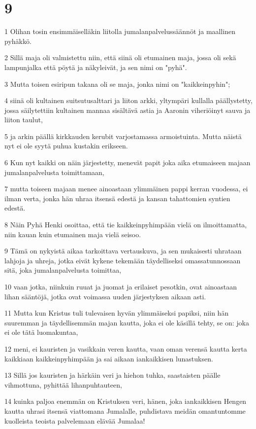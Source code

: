 \chapter{9}

\par 1 Olihan tosin ensimmäiselläkin liitolla jumalanpalvelussäännöt ja maallinen pyhäkkö.
\par 2 Sillä maja oli valmistettu niin, että siinä oli etumainen maja, jossa oli sekä lampunjalka että pöytä ja näkyleivät, ja sen nimi on "pyhä".
\par 3 Mutta toisen esiripun takana oli se maja, jonka nimi on "kaikkeinpyhin";
\par 4 siinä oli kultainen suitsutusalttari ja liiton arkki, yltympäri kullalla päällystetty, jossa säilytettiin kultainen mannaa sisältävä astia ja Aaronin viheriöinyt sauva ja liiton taulut,
\par 5 ja arkin päällä kirkkauden kerubit varjostamassa armoistuinta. Mutta näistä nyt ei ole syytä puhua kustakin erikseen.
\par 6 Kun nyt kaikki on näin järjestetty, menevät papit joka aika etumaiseen majaan jumalanpalvelusta toimittamaan,
\par 7 mutta toiseen majaan menee ainoastaan ylimmäinen pappi kerran vuodessa, ei ilman verta, jonka hän uhraa itsensä edestä ja kansan tahattomien syntien edestä.
\par 8 Näin Pyhä Henki osoittaa, että tie kaikkeinpyhimpään vielä on ilmoittamatta, niin kauan kuin etumainen maja vielä seisoo.
\par 9 Tämä on nykyistä aikaa tarkoittava vertauskuva, ja sen mukaisesti uhrataan lahjoja ja uhreja, jotka eivät kykene tekemään täydelliseksi omassatunnossaan sitä, joka jumalanpalvelusta toimittaa,
\par 10 vaan jotka, niinkuin ruuat ja juomat ja erilaiset pesotkin, ovat ainoastaan lihan sääntöjä, jotka ovat voimassa uuden järjestyksen aikaan asti.
\par 11 Mutta kun Kristus tuli tulevaisen hyvän ylimmäiseksi papiksi, niin hän suuremman ja täydellisemmän majan kautta, joka ei ole käsillä tehty, se on: joka ei ole tätä luomakuntaa,
\par 12 meni, ei kauristen ja vasikkain veren kautta, vaan oman verensä kautta kerta kaikkiaan kaikkeinpyhimpään ja sai aikaan iankaikkisen lunastuksen.
\par 13 Sillä jos kauristen ja härkäin veri ja hiehon tuhka, saastaisten päälle vihmottuna, pyhittää lihanpuhtauteen,
\par 14 kuinka paljoa enemmän on Kristuksen veri, hänen, joka iankaikkisen Hengen kautta uhrasi itsensä viattomana Jumalalle, puhdistava meidän omantuntomme kuolleista teoista palvelemaan elävää Jumalaa!
